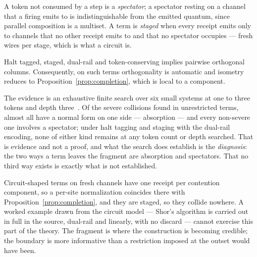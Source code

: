 \begin{definition}
\label{def:staging}
A token not consumed by a step is a \emph{spectator}; a spectator resting on
a channel that a firing emits to is indistinguishable from the emitted
quantum, since parallel composition is a multiset.  A term is \emph{staged}
when every receipt emits only to channels that no other receipt emits to and
that no spectator occupies --- fresh wires per stage, which is what a circuit
is.
\end{definition}

\begin{conjecture}
\label{conj:safe}
Halt tagged, staged, dual-rail and token-conserving implies pairwise
orthogonal columns.  Consequently, on such terms orthogonality is automatic
and isometry reduces to Proposition~\ref{prop:completion}, which is local to
a component.
\end{conjecture}

The evidence is an exhaustive finite search over six small systems at one to
three tokens and depth three~\cite{GradedQuantum}.  Of the severe collisions
found in unrestricted terms, almost all have a normal form on one side ---
absorption --- and every non-severe one involves a spectator; under halt
tagging and staging with the dual-rail encoding, none of either kind
remains at any token count or depth searched.  That is evidence and not a
proof, and what the search does establish is the \emph{diagnosis}: the two
ways a term leaves the fragment are absorption and spectators.  That no third
way exists is exactly what is not established.

\begin{remark}
Circuit-shaped terms on fresh channels have one receipt per contention
component, so a per-site normalization coincides there with
Proposition~\ref{prop:completion}, and they are staged, so they collide
nowhere.  A worked example drawn from the circuit model --- Shor's algorithm
is carried out in full in the source, dual-rail and linearly, with no
discard --- cannot exercise this part of the theory.  The fragment is where
the construction is becoming credible; the boundary is more informative than
a restriction imposed at the outset would have been.
\end{remark}

